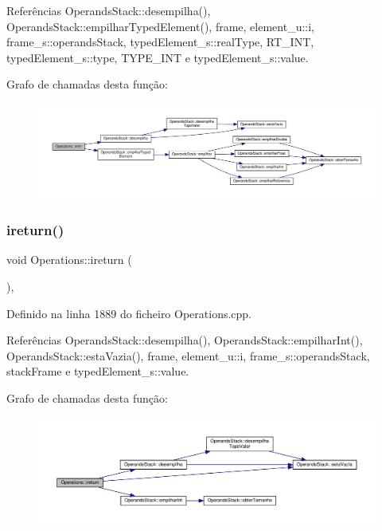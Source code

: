 Referências Operands\+Stack\+::desempilha(), Operands\+Stack\+::empilhar\+Typed\+Element(), frame, element\+\_\+u\+::i, frame\+\_\+s\+::operands\+Stack, typed\+Element\+\_\+s\+::real\+Type, R\+T\+\_\+\+I\+NT, typed\+Element\+\_\+s\+::type, T\+Y\+P\+E\+\_\+\+I\+NT e typed\+Element\+\_\+s\+::value.

Grafo de chamadas desta função\+:\nopagebreak
\begin{figure}[H]
\begin{center}
\leavevmode
\includegraphics[width=350pt]{classOperations_a510bd2d155695861597a4413b44565bc_cgraph}
\end{center}
\end{figure}
\mbox{\label{classOperations_a4be12fb7c8eeee8a2f6489ec27a46dce}} 
\subsubsection{\texorpdfstring{ireturn()}{ireturn()}}
{\footnotesize\ttfamily void Operations\+::ireturn (\begin{DoxyParamCaption}{ }\end{DoxyParamCaption})\hspace{0.3cm}{\ttfamily [static]}, {\ttfamily [private]}}



Definido na linha 1889 do ficheiro Operations.\+cpp.



Referências Operands\+Stack\+::desempilha(), Operands\+Stack\+::empilhar\+Int(), Operands\+Stack\+::esta\+Vazia(), frame, element\+\_\+u\+::i, frame\+\_\+s\+::operands\+Stack, stack\+Frame e typed\+Element\+\_\+s\+::value.

Grafo de chamadas desta função\+:\nopagebreak
\begin{figure}[H]
\begin{center}
\leavevmode
\includegraphics[width=350pt]{classOperations_a4be12fb7c8eeee8a2f6489ec27a46dce_cgraph}
\end{center}
\end{figure}
\mbox{\label{classOperations_a3139bbe41519fb4761ecd7e2a8ddb994}} 
